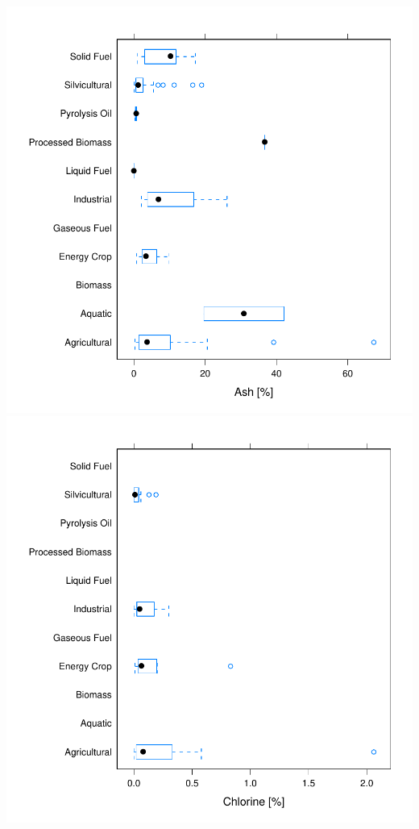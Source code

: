 \documentclass[a4paper]{article}
\begin{document}
\\
\newpage
\includegraphics{documentation/images/img-005}
\\
\newpage
\includegraphics{documentation/images/img-006}
\end{document}
